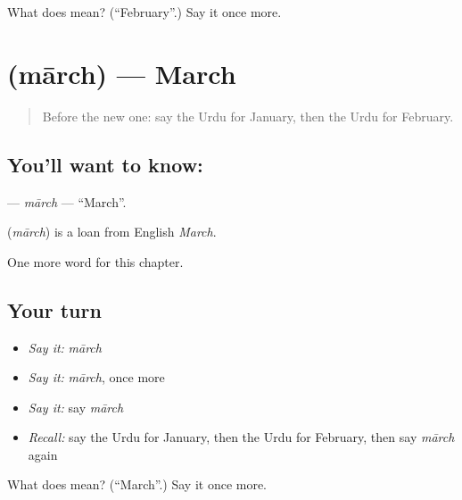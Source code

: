\begin{tcolorbox}[breakable,colback=teal!4,colframe=teal!35!black,title={Before you move on}]
What does  mean? (\textquotedblleft{}February\textquotedblright{}.) Say it once more.
\end{tcolorbox}
\section[\texorpdfstring{\ur{مارچ} (mārch)}{مارچ (mārch)}]{ (mārch) — March}

\label{lesson:UR-C155-march}



\begin{quote}
Before the new one: say the Urdu for January, then the Urdu for February.
\end{quote}

\subsection*{You'll want to know: }
\textbf{} — \emph{mārch} — \textquotedblleft{}March\textquotedblright{}.

\begin{cousinweb}
\textbf{} (\emph{mārch}) is a loan from English \emph{March}.
\end{cousinweb}

\begin{grammarlens}[title={What you've built}]
One more word for this chapter.
\end{grammarlens}

\subsection*{Your turn}
\begin{itemize}
\raggedright
  \item \emph{Say it:} \emph{mārch}
  \item \emph{Say it:} \emph{mārch}, once more
  \item \emph{Say it:} say \emph{mārch}
  \item \emph{Recall:} say the Urdu for January, then the Urdu for February, then say \emph{mārch} again
\end{itemize}

\begin{tcolorbox}[breakable,colback=teal!4,colframe=teal!35!black,title={Before you move on}]
What does  mean? (\textquotedblleft{}March\textquotedblright{}.) Say it once more.
\end{tcolorbox}
